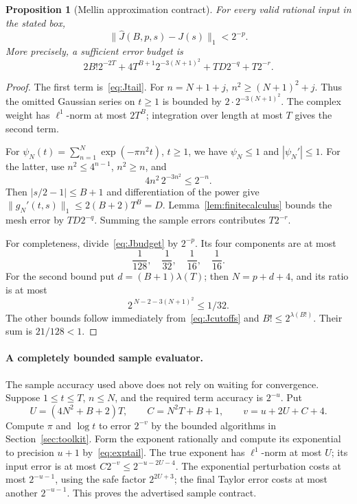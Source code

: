 \documentclass[11pt,letterpaper]{article}
\numberwithin{equation}{section}
\newtheorem{proposition}[theorem]{Proposition}
\theoremstyle{definition}
\newcommand{\normone}[1]{\lVert #1\rVert_1}
\newcommand{\ps}{\psi}
\newcommand{\Jh}{\widehat J}
\newcommand{\lceilog}{\lambda}
\begin{document}
\begin{proposition}[Mellin approximation contract]\label{prop:Jcontract}
For every valid rational input in the stated box,
\[
                  \normone{\Jh(B,p,s)-J(s)}<2^{-p}.
\]
More precisely, a sufficient error budget is
\begin{equation}
 2B!2^{-2T}
 +4T^{B+1}2^{-3(N+1)^2}
 +TD2^{-q}
 +T2^{-r}.                                               \label{eq:Jbudget}
\end{equation}
\end{proposition}

\begin{proof}
The first term is~\eqref{eq:Jtail}.
For \(n=N+1+j\), \(n^2\ge(N+1)^2+j\).
Thus the omitted Gaussian series on \(t\ge1\) is bounded by
\(2\cdot2^{-3(N+1)^2}\). The complex weight has
\(\ell^1\)-norm at most \(2T^B\); integration over length at most
\(T\) gives the second term.

For \(\ps_N(t)=\sum_{n=1}^N\exp(-\pi n^2t)\), \(t\ge1\),
we have \(\ps_N\le1\) and \(|\ps_N'|\le1\).
For the latter, use \(n^2\le4^{n-1}\), \(n^2\ge n\), and
\[
       4n^2\,2^{-3n^2}\le2^{-n}.
\]
Then \(|s/2-1|\le B+1\) and differentiation of the power give
\(\normone{g_N'(t,s)}\le2(B+2)T^B=D\).
Lemma~\ref{lem:finitecalculus} bounds the mesh error by
\(TD2^{-q}\). Summing the sample errors contributes \(T2^{-r}\).

For completeness, divide~\eqref{eq:Jbudget} by \(2^{-p}\).
Its four components are at most
\[
                    \frac1{128},\quad\frac1{32},
                    \quad\frac1{16},\quad\frac1{16}.
\]
For the second bound put \(d=(B+1)\lceilog(T)\);
then \(N=p+d+4\), and its ratio is at most
\[
             2^{\,N-2-3(N+1)^2}\le1/32.
\]
The other bounds follow immediately from~\eqref{eq:Jcutoffs}
and \(B!\le2^{\lceilog(B!)}\).
Their sum is \(21/128<1\).
\end{proof}

\paragraph{A completely bounded sample evaluator.}
The sample accuracy used above does not rely on waiting for convergence.
Suppose \(1\le t\le T\), \(n\le N\), and the required term accuracy is
\(2^{-u}\). Put
\begin{equation}
 U=(4N^2+B+2)T,\qquad C=N^2T+B+1,\qquad
 v=u+2U+C+4.
 \label{eq:sampleprecision}
\end{equation}
Compute \(\pi\) and \(\log t\) to error \(2^{-v}\) by the
bounded algorithms in Section~\ref{sec:toolkit}. Form the
exponent rationally and compute its exponential to precision
\(u+1\) by~\eqref{eq:exptail}.
The true exponent has \(\ell^1\)-norm at most \(U\); its input error
is at most \(C2^{-v}\le2^{-u-2U-4}\).
The exponential perturbation costs at most \(2^{-u-1}\), using
the safe factor \(2^{2U+3}\); the final Taylor error costs at most
another \(2^{-u-1}\). This proves the advertised sample contract.
\end{document}
